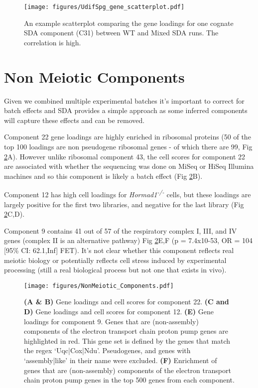 \begin{figure}[H]
	\centering
	\texttt{[image: figures/UdifSpg\_gene\_scatterplot.pdf]}
	\caption{An example scatterplot comparing the gene loadings for one cognate SDA component (C31) between WT and Mixed SDA runs. The correlation is high.}
	\label{fig:WT_Mix_Correlation}
\end{figure}


\section{Non Meiotic Components}

Given we combined multiple experimental batches it's important to correct for batch effects and SDA provides a simple approach as some inferred components will capture these effects and can be removed.

Component 22 gene loadings are highly enriched in ribosomal proteins (50 of the top 100 loadings are non pseudogene ribosomal genes - of which there are 99, Fig \ref{fig:NonMeiotic}A). However unlike ribosomal component 43, the cell scores for component 22 are associated with whether the sequencing was done on MiSeq or HiSeq Illumina machines and so this component is likely a batch effect (Fig \ref{fig:NonMeiotic}B).

Component 12 has high cell loadings for \textit{Hormad1\textsuperscript{-/-}} cells, but these loadings are largely positive for the first two libraries, and negative for the last library (Fig \ref{fig:NonMeiotic}C,D).

Component 9 contains 41 out of 57 of the respiratory complex I, III, and IV genes (complex II is an alternative pathway) Fig \ref{fig:NonMeiotic}E,F (p = 7.4x10-53, OR = 104 [95\% CI: 62.1,Inf] FET). It's not clear whether this component reflects real meiotic biology or potentially reflects cell stress induced by experimental processing (still a real biological process but not one that exists in vivo).

\begin{figure}[H]
	\centering
	\texttt{[image: figures/NonMeiotic\_Components.pdf]}
	\caption{
		\textbf{(A \& B)} Gene loadings and cell scores for component 22.
		\textbf{(C and D)} Gene loadings and cell scores for component 12.
		\textbf{(E)} Gene loadings for component 9. Genes that are (non-assembly) components of the electron transport chain proton pump genes are highlighted in red. This gene set is defined by the genes that match the regex ‘Uqc|Cox|Ndu’. Pseudogenes, and genes with ‘assembly|like’ in their name were excluded.
		\textbf{(F)} Enrichment of genes that are (non-assembly) components of the electron transport chain proton pump genes in the top 500 genes from each component.
	}
	\label{fig:NonMeiotic}
\end{figure}


